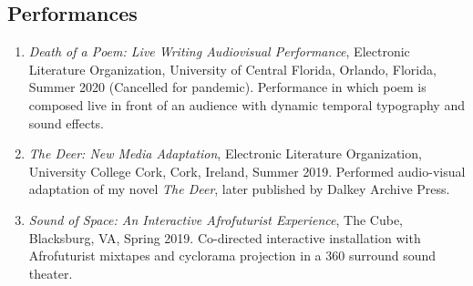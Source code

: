  
 
 \subsection{Performances}
 \begin{enumerate}
 \item \emph{Death of a Poem: Live Writing Audiovisual Performance}, Electronic Literature Organization, University of Central Florida, Orlando, Florida, Summer 2020 (Cancelled for pandemic). \subitem Performance in which poem is composed live in front of an audience with dynamic temporal typography and sound effects.\\
 \item \emph{The Deer: New Media Adaptation}, Electronic Literature Organization, University College Cork, Cork, Ireland, Summer 2019. \subitem Performed audio-visual adaptation of my novel \emph{The Deer}, later published by Dalkey Archive Press. \\
 \item \emph{Sound of Space: An Interactive Afrofuturist Experience}, The Cube, Blacksburg, VA, Spring 2019. \subitem Co-directed interactive installation with Afrofuturist mixtapes and cyclorama projection in a 360 surround sound theater.  \\


\end{enumerate}
